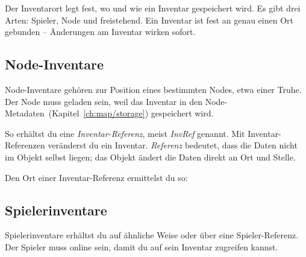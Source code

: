 Der Inventarort legt fest, wo und wie ein Inventar gespeichert wird. Es
gibt drei Arten: Spieler, Node und freistehend. Ein Inventar ist fest an
genau einen Ort gebunden -- Änderungen am Inventar wirken sofort.

\subsection{Node-Inventare}\label{node-inventare}

Node-Inventare gehören zur Position eines bestimmten Nodes, etwa einer
Truhe. Der Node muss geladen sein, weil das Inventar in den
Node-Metadaten~(Kapitel~\ref{ch:map/storage}) gespeichert wird.

\begin{Shaded}
\begin{Highlighting}[]
 \OperatorTok{=} \OperatorTok{(}\OperatorTok{,} \OperatorTok{)}
      \OperatorTok{=}
        \OperatorTok{(\{}  \OperatorTok{=} \OperatorTok{,}  \OperatorTok{=}  \OperatorTok{\})}
\OperatorTok{,}
\end{Highlighting}
\end{Shaded}

So erhältst du eine \emph{Inventar-Referenz}, meist \emph{InvRef}
genannt. Mit Inventar-Referenzen veränderst du ein Inventar.
\emph{Referenz} bedeutet, dass die Daten nicht im Objekt selbst liegen;
das Objekt ändert die Daten direkt an Ort und Stelle.

Den Ort einer Inventar-Referenz ermittelst du so:

\begin{Shaded}
\begin{Highlighting}[]
  \OperatorTok{=} \OperatorTok{:}\OperatorTok{()}
\end{Highlighting}
\end{Shaded}

\subsection{Spielerinventare}\label{spielerinventare}

Spielerinventare erhältst du auf ähnliche Weise oder über eine
Spieler-Referenz. Der Spieler muss online sein, damit du auf sein
Inventar zugreifen kannst.

